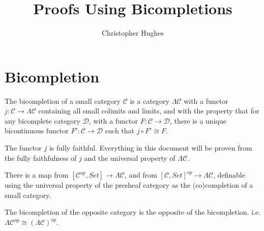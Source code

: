 \documentclass[12pt]{article} %
\title{Proofs Using Bicompletions}
\author{Christopher Hughes}
\theoremstyle{definition}
\theoremstyle{definition}
\theoremstyle{definition}
\theoremstyle{definition}
\begin{document}
\section{Bicompletion}

The bicompletion of a small category $\mathcal{C}$ is a category $\Lambda \mathcal{C}$ with a functor
$j : \mathcal{C} \to \Lambda \mathcal{C}$ containing all small colimits and limits, and with 
the property that for any bicomplete category $\mathcal{D}$, with a functor $F : \mathcal{C} \to \mathcal{D}$,
there is a unique bicontinuous functor $F' : \mathcal{C} \to \mathcal{D}$ such that
$j \circ F' \cong F$. 

The functor $j$ is fully faithful. Everything in this document will be proven from the fully faithfulness of
$j$ and the universal property of $\Lambda \mathcal{C}$.

There is a map from $[\mathcal{C}^{op}, Set] \to \Lambda \mathcal{C}$, and from 
$[\mathcal{C}, Set]^{op} \to \Lambda \mathcal{C}$, definable using the universal property
of the presheaf category as the (co)completion of a small category.

The bicompletion of the opposite category is the opposite of the bicompletion. i.e.
$\Lambda {\mathcal{C}^{op}} \cong (\Lambda \mathcal{C})^{op}$.





\end{document}
